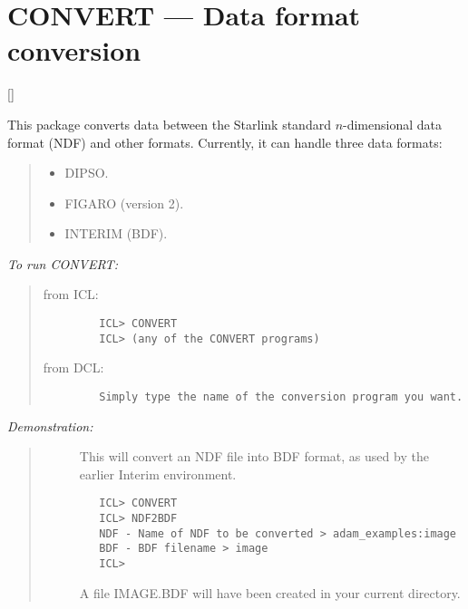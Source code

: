 \newpage

\section{CONVERT --- Data format conversion}

\vspace{-11mm}

\hfill []

\vspace{5mm}

This package converts data between the Starlink standard $n$-dimensional data
format (NDF) and other formats.
Currently, it can handle three data formats:

{\small
\begin{quote}
\begin{itemize}
\item DIPSO.
\item FIGARO (version 2).
\item INTERIM (BDF).
\end{itemize}
\end{quote}
}

{\em To run CONVERT:}\hfill
\begin{quote}
\begin{description}

\item [from ICL:]\hfill

\begin{small}
\begin{verbatim}
   ICL> CONVERT
   ICL> (any of the CONVERT programs)
\end{verbatim}
\end{small}

\item [from DCL:]\hfill

\begin{small}
\begin{verbatim}
   Simply type the name of the conversion program you want.
\end{verbatim}
\end{small}

\end{description}
\end{quote}

{\em Demonstration:}\hfill
\begin{quote}
\begin{description}
\item [] This will convert an NDF file into BDF format, as used by the
earlier Interim environment.

\begin{small}
\begin{verbatim}
   ICL> CONVERT
   ICL> NDF2BDF
   NDF - Name of NDF to be converted > adam_examples:image
   BDF - BDF filename > image
   ICL>
\end{verbatim}
\end{small}

A file IMAGE.BDF will have been created in your current directory.
\end{description}
\end{quote}

